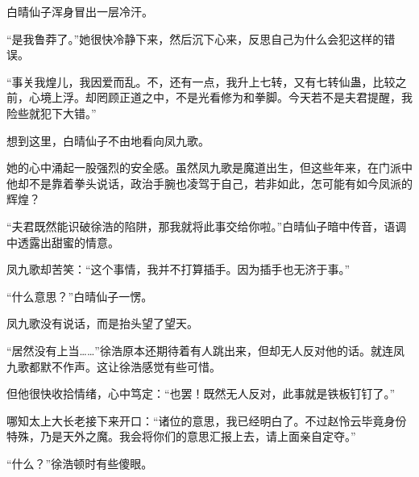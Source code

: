 \begin{this_body}
白晴仙子浑身冒出一层冷汗。

“是我鲁莽了。”她很快冷静下来，然后沉下心来，反思自己为什么会犯这样的错误。

“事关我煌儿，我因爱而乱。不，还有一点，我升上七转，又有七转仙蛊，比较之前，心境上浮。却罔顾正道之中，不是光看修为和拳脚。今天若不是夫君提醒，我险些就犯下大错。”

想到这里，白晴仙子不由地看向凤九歌。

她的心中涌起一股强烈的安全感。虽然凤九歌是魔道出生，但这些年来，在门派中他却不是靠着拳头说话，政治手腕也凌驾于自己，若非如此，怎可能有如今凤派的辉煌？

“夫君既然能识破徐浩的陷阱，那我就将此事交给你啦。”白晴仙子暗中传音，语调中透露出甜蜜的情意。

凤九歌却苦笑：“这个事情，我并不打算插手。因为插手也无济于事。”

“什么意思？”白晴仙子一愣。

凤九歌没有说话，而是抬头望了望天。

“居然没有上当……”徐浩原本还期待着有人跳出来，但却无人反对他的话。就连凤九歌都默不作声。这让徐浩感觉有些可惜。

但他很快收拾情绪，心中笃定：“也罢！既然无人反对，此事就是铁板钉钉了。”

哪知太上大长老接下来开口：“诸位的意思，我已经明白了。不过赵怜云毕竟身份特殊，乃是天外之魔。我会将你们的意思汇报上去，请上面亲自定夺。”

“什么？”徐浩顿时有些傻眼。

\end{this_body}

